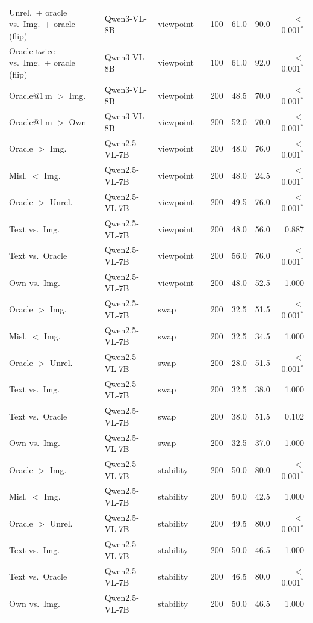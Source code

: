 \begin{longtable}{llllrrrr}
Unrel.\ + oracle vs.\ Img.\ + oracle (flip) & Qwen3-VL-8B & viewpoint & & 100 & 61.0 & 90.0 & $<$0.001$^*$ \\
Oracle twice vs.\ Img.\ + oracle (flip) & Qwen3-VL-8B & viewpoint & & 100 & 61.0 & 92.0 & $<$0.001$^*$ \\
Oracle@1\,m $>$ Img. & Qwen3-VL-8B & viewpoint & & 200 & 48.5 & 70.0 & $<$0.001$^*$ \\
Oracle@1\,m $>$ Own & Qwen3-VL-8B & viewpoint & & 200 & 52.0 & 70.0 & $<$0.001$^*$ \\
Oracle $>$ Img. & Qwen2.5-VL-7B & viewpoint & & 200 & 48.0 & 76.0 & $<$0.001$^*$ \\
Misl. $<$ Img. & Qwen2.5-VL-7B & viewpoint & & 200 & 48.0 & 24.5 & $<$0.001$^*$ \\
Oracle $>$ Unrel. & Qwen2.5-VL-7B & viewpoint & & 200 & 49.5 & 76.0 & $<$0.001$^*$ \\
Text vs.\ Img. & Qwen2.5-VL-7B & viewpoint & & 200 & 48.0 & 56.0 & 0.887 \\
Text vs.\ Oracle & Qwen2.5-VL-7B & viewpoint & & 200 & 56.0 & 76.0 & $<$0.001$^*$ \\
Own vs.\ Img. & Qwen2.5-VL-7B & viewpoint & & 200 & 48.0 & 52.5 & 1.000 \\
Oracle $>$ Img. & Qwen2.5-VL-7B & swap & & 200 & 32.5 & 51.5 & $<$0.001$^*$ \\
Misl. $<$ Img. & Qwen2.5-VL-7B & swap & & 200 & 32.5 & 34.5 & 1.000 \\
Oracle $>$ Unrel. & Qwen2.5-VL-7B & swap & & 200 & 28.0 & 51.5 & $<$0.001$^*$ \\
Text vs.\ Img. & Qwen2.5-VL-7B & swap & & 200 & 32.5 & 38.0 & 1.000 \\
Text vs.\ Oracle & Qwen2.5-VL-7B & swap & & 200 & 38.0 & 51.5 & 0.102 \\
Own vs.\ Img. & Qwen2.5-VL-7B & swap & & 200 & 32.5 & 37.0 & 1.000 \\
Oracle $>$ Img. & Qwen2.5-VL-7B & stability & & 200 & 50.0 & 80.0 & $<$0.001$^*$ \\
Misl. $<$ Img. & Qwen2.5-VL-7B & stability & & 200 & 50.0 & 42.5 & 1.000 \\
Oracle $>$ Unrel. & Qwen2.5-VL-7B & stability & & 200 & 49.5 & 80.0 & $<$0.001$^*$ \\
Text vs.\ Img. & Qwen2.5-VL-7B & stability & & 200 & 50.0 & 46.5 & 1.000 \\
Text vs.\ Oracle & Qwen2.5-VL-7B & stability & & 200 & 46.5 & 80.0 & $<$0.001$^*$ \\
Own vs.\ Img. & Qwen2.5-VL-7B & stability & & 200 & 50.0 & 46.5 & 1.000 \\

\end{longtable}
